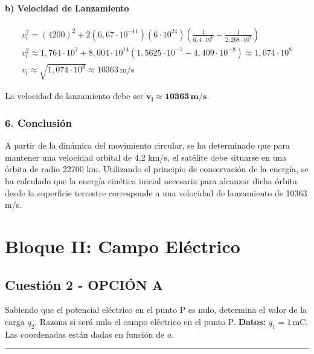 \paragraph{b) Velocidad de Lanzamiento}
\begin{gather}
    v_l^2 = (4200)^2 + 2(6,67\cdot10^{-11})(6\cdot10^{24})\left(\frac{1}{6,4\cdot10^6} - \frac{1}{2,268\cdot10^7}\right) \nonumber \\
    v_l^2 \approx 1,764\cdot10^7 + 8,004\cdot10^{14}(1,5625\cdot10^{-7} - 4,409\cdot10^{-8}) \approx 1,074\cdot10^8 \nonumber \\
    v_l \approx \sqrt{1,074\cdot10^8} \approx 10363 \, \text{m/s}
\end{gather}
\begin{cajaresultado}
La velocidad de lanzamiento debe ser $\boldsymbol{v_l \approx 10363 \, \textbf{m/s}}$.
\end{cajaresultado}
\subsubsection*{6. Conclusión}
\begin{cajaconclusion}
A partir de la dinámica del movimiento circular, se ha determinado que para mantener una velocidad orbital de 4,2 km/s, el satélite debe situarse en una órbita de radio 22700 km. Utilizando el principio de conservación de la energía, se ha calculado que la energía cinética inicial necesaria para alcanzar dicha órbita desde la superficie terrestre corresponde a una velocidad de lanzamiento de 10363 m/s.
\end{cajaconclusion}
\newpage

\section{Bloque II: Campo Eléctrico}
\label{sec:elec_2019_jun_ord}

\subsection{Cuestión 2 - OPCIÓN A}
\label{subsec:2A_2019_jun_ord}

\begin{cajaenunciado}
Sabiendo que el potencial eléctrico en el punto P es nulo, determina el valor de la carga $q_{2}$. Razona si será nulo el campo eléctrico en el punto P.
\textbf{Datos:} $q_{1}=1\,\text{mC}$. Las coordenadas están dadas en función de $a$.
\end{cajaenunciado}
\hrule

